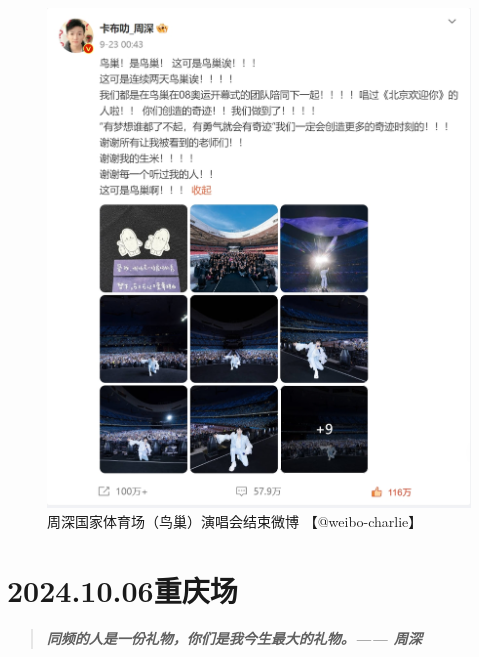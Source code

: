 \documentclass[]{ctexbook}
\begin{document}
\begin{figure}

{\centering \includegraphics{img/weibo/beijing-20240923} 

}

\caption{周深国家体育场（鸟巢）演唱会结束微博 【@weibo-charlie】}\label{fig:unnamed-chunk-112}
\end{figure}

\chapter{2024.10.06重庆场}\label{chongqing-20241006}

\begin{quote}
\textbf{\emph{同频的人是一份礼物，你们是我今生最大的礼物。------ 周深}}
\end{quote}
\end{document}
